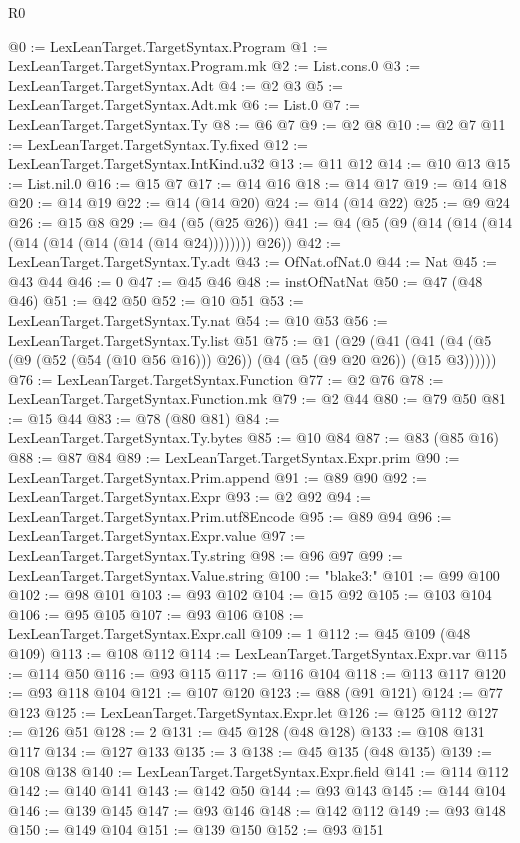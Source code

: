 \begin{lexlean}{R0}
\begin{coremodule}
@0 := LexLeanTarget.TargetSyntax.Program
@1 := LexLeanTarget.TargetSyntax.Program.mk
@2 := List.cons.{0}
@3 := LexLeanTarget.TargetSyntax.Adt
@4 := @2 @3
@5 := LexLeanTarget.TargetSyntax.Adt.mk
@6 := List.{0}
@7 := LexLeanTarget.TargetSyntax.Ty
@8 := @6 @7
@9 := @2 @8
@10 := @2 @7
@11 := LexLeanTarget.TargetSyntax.Ty.fixed
@12 := LexLeanTarget.TargetSyntax.IntKind.u32
@13 := @11 @12
@14 := @10 @13
@15 := List.nil.{0}
@16 := @15 @7
@17 := @14 @16
@18 := @14 @17
@19 := @14 @18
@20 := @14 @19
@22 := @14 (@14 @20)
@24 := @14 (@14 @22)
@25 := @9 @24
@26 := @15 @8
@29 := @4 (@5 (@25 @26))
@41 := @4 (@5 (@9 (@14 (@14 (@14 (@14 (@14 (@14 (@14 (@14 @24)))))))) @26))
@42 := LexLeanTarget.TargetSyntax.Ty.adt
@43 := OfNat.ofNat.{0}
@44 := Nat
@45 := @43 @44
@46 := 0
@47 := @45 @46
@48 := instOfNatNat
@50 := @47 (@48 @46)
@51 := @42 @50
@52 := @10 @51
@53 := LexLeanTarget.TargetSyntax.Ty.nat
@54 := @10 @53
@56 := LexLeanTarget.TargetSyntax.Ty.list @51
@75 := @1
    (@29 (@41 (@41 (@4 (@5 (@9 (@52 (@54 (@10 @56 @16))) @26)) (@4 (@5 (@9 @20 @26)) (@15 @3))))))
@76 := LexLeanTarget.TargetSyntax.Function
@77 := @2 @76
@78 := LexLeanTarget.TargetSyntax.Function.mk
@79 := @2 @44
@80 := @79 @50
@81 := @15 @44
@83 := @78 (@80 @81)
@84 := LexLeanTarget.TargetSyntax.Ty.bytes
@85 := @10 @84
@87 := @83 (@85 @16)
@88 := @87 @84
@89 := LexLeanTarget.TargetSyntax.Expr.prim
@90 := LexLeanTarget.TargetSyntax.Prim.append
@91 := @89 @90
@92 := LexLeanTarget.TargetSyntax.Expr
@93 := @2 @92
@94 := LexLeanTarget.TargetSyntax.Prim.utf8Encode
@95 := @89 @94
@96 := LexLeanTarget.TargetSyntax.Expr.value
@97 := LexLeanTarget.TargetSyntax.Ty.string
@98 := @96 @97
@99 := LexLeanTarget.TargetSyntax.Value.string
@100 := "blake3:"
@101 := @99 @100
@102 := @98 @101
@103 := @93 @102
@104 := @15 @92
@105 := @103 @104
@106 := @95 @105
@107 := @93 @106
@108 := LexLeanTarget.TargetSyntax.Expr.call
@109 := 1
@112 := @45 @109 (@48 @109)
@113 := @108 @112
@114 := LexLeanTarget.TargetSyntax.Expr.var
@115 := @114 @50
@116 := @93 @115
@117 := @116 @104
@118 := @113 @117
@120 := @93 @118 @104
@121 := @107 @120
@123 := @88 (@91 @121)
@124 := @77 @123
@125 := LexLeanTarget.TargetSyntax.Expr.let
@126 := @125 @112
@127 := @126 @51
@128 := 2
@131 := @45 @128 (@48 @128)
@133 := @108 @131 @117
@134 := @127 @133
@135 := 3
@138 := @45 @135 (@48 @135)
@139 := @108 @138
@140 := LexLeanTarget.TargetSyntax.Expr.field
@141 := @114 @112
@142 := @140 @141
@143 := @142 @50
@144 := @93 @143
@145 := @144 @104
@146 := @139 @145
@147 := @93 @146
@148 := @142 @112
@149 := @93 @148
@150 := @149 @104
@151 := @139 @150
@152 := @93 @151

\end{coremodule}
\end{lexlean}
